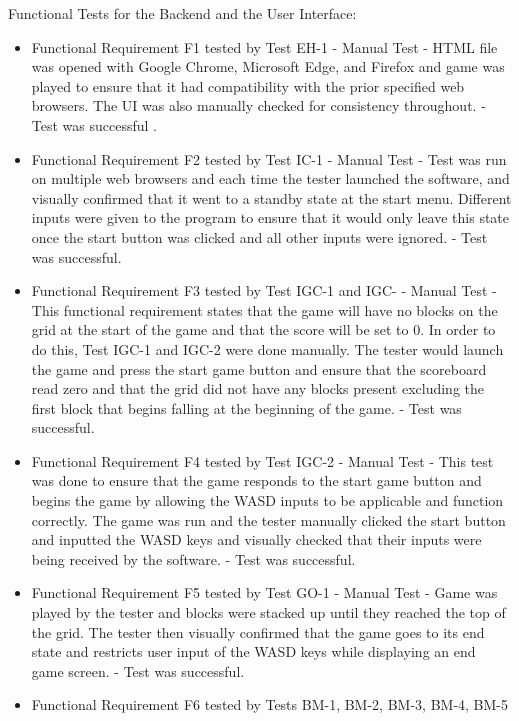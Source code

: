 \documentclass[12pt, titlepage]{article}
\begin{document}
Functional Tests for the Backend and the User Interface:
\begin{itemize}
    \item Functional Requirement F1 tested by Test EH-1
    \subitem - Manual Test
    \subitem - HTML file was opened with Google Chrome, Microsoft Edge, and Firefox and game was played to ensure that it had compatibility with the prior specified web browsers. The UI was also manually checked for consistency throughout.
    \subitem - Test was successful .
    \item Functional Requirement F2 tested by Test IC-1
    \subitem - Manual Test
    \subitem - Test was run on multiple web browsers and each time the tester launched the software, and visually confirmed that it went to a standby state at the start menu. Different inputs were given to the program to ensure that it would only leave this state once the start button was clicked and all other inputs were ignored.
    \subitem - Test was successful.
    \item Functional Requirement F3 tested by Test IGC-1 and IGC-
    \subitem - Manual Test
    \subitem - This functional requirement states that the game will have no blocks on the grid at the start of the game and that the score will be set to 0. In order to do this, Test IGC-1 and IGC-2 were done manually. The tester would launch the game and press the start game button and ensure that the scoreboard read zero and that the grid did not have any blocks present excluding the first block that begins falling at the beginning of the game.
    \subitem - Test was successful.
    \item Functional Requirement F4 tested by Test IGC-2
    \subitem - Manual Test
    \subitem - This test was done to ensure that the game responds to the start game button and begins the game by allowing the WASD inputs to be applicable and function correctly. The game was run and the tester manually clicked the start button and inputted the WASD keys and visually checked that their inputs were being received by the software.
    \subitem - Test was successful.
    \item Functional Requirement F5 tested by Test GO-1
    \subitem - Manual Test
    \subitem - Game was played by the tester and blocks were stacked up until they reached the top of the grid. The tester then visually confirmed that the game goes to its end state and restricts user input of the WASD keys while displaying an end game screen.
    \subitem - Test was successful.
    \item Functional Requirement F6 tested by Tests BM-1, BM-2, BM-3, BM-4, BM-5

\end{itemize}
\end{document}
